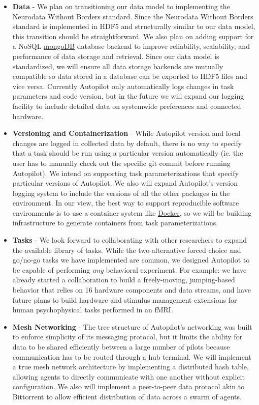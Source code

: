 \begin{fullwidth}
\begin{itemize}
    \item \textbf{Data} - We plan on transitioning our data model to implementing the Neurodata Without Borders\citep{rubelNWBAccessibleData2019} standard.  Since the Neurodata Without Borders standard is implemented in HDF5 and structurally similar to our data model, this transition should be straightforward. We also plan on adding support for a NoSQL \href{https://www.mongodb.com/}{mongoDB} database backend to improve reliability, scalability, and performance of data storage and retrieval. Since our data model is standardized, we will ensure all data storage backends are mutually compatible so data stored in a database can be exported to HDF5 files and vice versa. Currently Autopilot only automatically logs changes in task parameters and code version, but in the future we will expand our logging facility to include detailed data on systemwide preferences and connected hardware. 
    \item \textbf{Versioning and Containerization} - While Autopilot version and local changes are logged in collected data by default, there is no way to specify that a task should be run using a particular version automatically (ie. the user has to manually check out the specific git commit before running Autopilot). We intend on supporting task parameterizations that specify particular versions of Autopilot. We also will expand Autopilot's version logging system to include the versions of all the other packages in the environment. In our view, the best way to support reproducible software environments is to use a container system like \href{https://www.docker.com/}{Docker}, so we will be building infrastructure to generate containers from task parameterizations.
    \item \textbf{Tasks} - We look forward to collaborating with other researchers to expand the available library of tasks. While the two-alternative forced choice and go/no-go tasks we have implemented are common, we designed Autopilot to be capable of performing \textit{any} behavioral experiment. For example: we have already started a collaboration to build a freely-moving, jumping-based behavior that relies on 16 hardware components and data streams, and have future plans to build hardware and stimulus management extensions for human psychophysical tasks performed in an fMRI. 
    \item \textbf{Mesh Networking} - The tree structure of Autopilot's networking was built to enforce simplicity of its messaging protocol, but it limits the ability for data to be shared efficiently between a large number of pilots because communication has to be routed through a hub terminal. We will implement a true mesh network architecture by implementing a distributed hash table, allowing agents to directly communicate with one another without explicit configuration. We also will implement a peer-to-peer data protocol akin to Bittorrent to allow efficient distribution of data across a swarm of agents.

\end{itemize}
\end{fullwidth}
